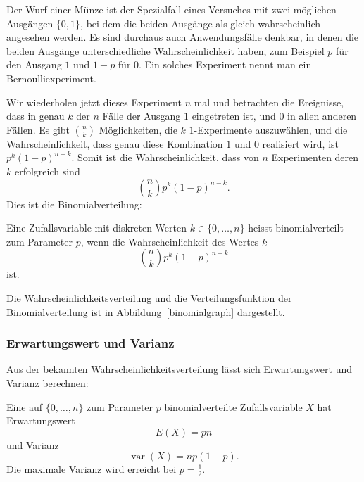 Der Wurf einer Münze ist der Spezialfall eines Versuches mit
zwei möglichen Ausgängen $\{0,1\}$, bei dem die beiden Ausgänge als
gleich wahrscheinlich angesehen werden.
Es sind durchaus auch
Anwendungsfälle denkbar, in denen die beiden Ausgänge unterschiedliche
Wahrscheinlichkeit haben, zum Beispiel $p$ für den Ausgang $1$ und $1-p$
für $0$.
Ein solches Experiment nennt man ein Bernoulliexperiment.

Wir wiederholen jetzt dieses Experiment $n$ mal und betrachten die Ereignisse,
dass in genau $k$ der $n$ Fälle der Ausgang $1$ eingetreten ist,
und $0$ in allen anderen Fällen.
Es gibt $\binom{n}{k}$ Möglichkeiten,
die $k$ $1$-Experimente auszuwählen, und die Wahrscheinlichkeit, dass genau
diese Kombination $1$ und $0$ realisiert wird, ist $p^k(1-p)^{n-k}$.
Somit ist die Wahrscheinlichkeit, dass von $n$ Experimenten deren $k$
erfolgreich sind
\[
\binom{n}{k}p^k(1-p)^{n-k}.
\]
Dies ist die Binomialverteilung:
\begin{definition}
Eine Zufallsvariable mit diskreten Werten $k\in\{0,\dots,n\}$
heisst binomialverteilt zum Parameter $p$, wenn die Wahrscheinlichkeit
des Wertes $k$ 
\[
\binom{n}{k}p^k(1-p)^{n-k}
\]
ist.
\end{definition}

Die Wahrscheinlichkeitsverteilung und die Verteilungsfunktion der
Binomialverteilung ist in Abbildung~\ref{binomialgraph} dargestellt.

\subsubsection{Erwartungswert und Varianz}
Aus der bekannten Wahrscheinlichkeitsverteilung lässt sich
Erwartungswert und Varianz berechnen:
\begin{satz}
Eine auf $\{0,\dots,n\}$ zum Parameter $p$ binomialverteilte Zufallsvariable
$X$ hat Erwartungswert
\[
E(X)=pn
\]
und Varianz
\[
\operatorname{var}(X)=np(1-p).
\]
Die maximale Varianz wird erreicht bei $p=\frac12$.
\end{satz}

